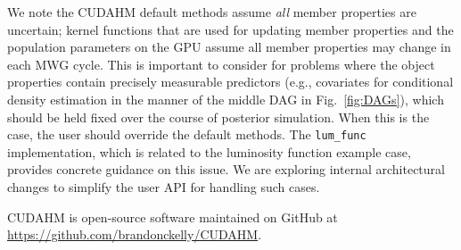 We note the CUDAHM default methods assume \emph{all} member properties are uncertain; kernel functions that are used for updating member properties and the population parameters on the GPU assume all member properties may change in each MWG cycle.
This is important to consider for problems where the object properties contain precisely measurable predictors (e.g., covariates for conditional density estimation in the manner of the middle DAG in Fig.~\ref{fig:DAGs}), which should be held fixed over the course of posterior simulation.
When this is the case, the user should override the default methods.
The \texttt{lum\_func} implementation, which is related to the luminosity function example case, provides concrete guidance on this issue.
We are exploring internal architectural changes to simplify the user API for handling such cases.



CUDAHM is open-source software maintained on GitHub at \url{https://github.com/brandonckelly/CUDAHM}.